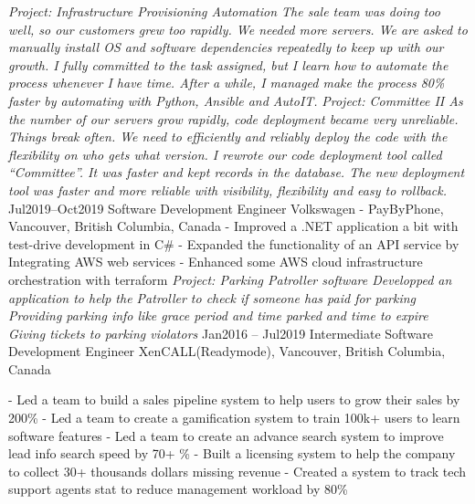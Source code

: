 \documentclass[9pt]{developercv} %
\begin{document}
\begin{entrylist}
{            \textit{Project: Infrastructure Provisioning Automation\newline
            The sale team was doing too well, so our customers grew too rapidly. We needed more servers.  
            We are asked to manually install OS and software dependencies repeatedly to keep up with our growth. I fully committed to the task assigned, but I learn how to automate the process whenever I have time. After a while, I managed make the process 80\% faster by automating with Python, Ansible and AutoIT.\newline\newline}
            \textit{Project: Committee II\newline
            As the number of our servers grow rapidly, code deployment became very unreliable. Things break often. We need to efficiently and reliably deploy the code with the flexibility on who gets what version. I rewrote our code deployment tool called “Committee”. It was faster and kept records in the database. The new deployment tool was faster and more reliable with visibility, flexibility and easy to rollback.\newline}
        }
		\entry
		{Jul2019--Oct2019}
		{Software Development Engineer}
		{Volkswagen - PayByPhone, Vancouver, British Columbia, Canada}
		{
            - Improved a .NET application a bit with test-drive development in C\#\newline
            - Expanded the functionality of an API service by Integrating AWS web services\newline 
            - Enhanced some AWS cloud infrastructure orchestration with terraform\newline\newline
			\textit{Project: Parking Patroller software\newline
            Developped an application to help the Patroller to check if someone has paid for parking
            Providing parking info like grace period and time parked and time to expire
            Giving tickets to parking violators \newline}
        }
	\entry
		{Jan2016 -- Jul2019}
		{Intermediate Software Development Engineer}
		{XenCALL(Readymode), Vancouver, British Columbia, Canada}
		{
            - Led a team to build a sales pipeline system to help users to grow their sales by 200\%\newline
            - Led a team to create a gamification system to train 100k+ users to learn software features\newline
            - Led a team to create an advance search system to improve lead info search speed by 70+ \%\newline
            - Built a licensing system to help the company to collect 30+ thousands dollars missing revenue\newline
            - Created a system to track tech support agents stat to reduce management workload by 80\%\newline

}
\end{entrylist}
\end{document}
